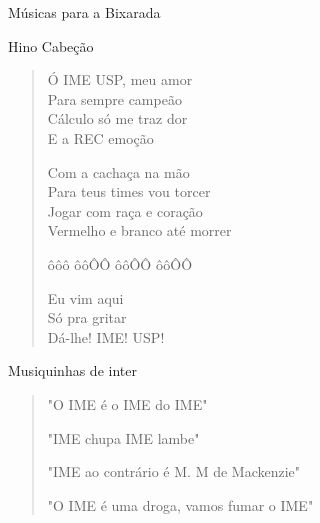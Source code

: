 \begin{secao}{Músicas para a Bixarada}

\begin{subsecao}{Hino Cabeção}
\begin{verse}

Ó IME USP, meu amor\\
Para sempre campeão\\
Cálculo só me traz dor\\
E a REC emoção

Com a cachaça na mão\\
Para teus times vou torcer\\
Jogar com raça e coração\\
Vermelho e branco até morrer

ôôô ôôÔÔ ôôÔÔ ôôÔÔ

Eu vim aqui\\
Só pra gritar\\
Dá-lhe! IME! USP!
\end{verse}
\end{subsecao}

\begin{subsecao}{Musiquinhas de inter}
\begin{verse}

"O IME é o IME do IME"

"IME chupa IME lambe"

"IME ao contrário é M. M de Mackenzie"

"O IME é uma droga, vamos fumar o IME"

\end{verse}
\end{subsecao}
\pagebreak




\end{secao}
